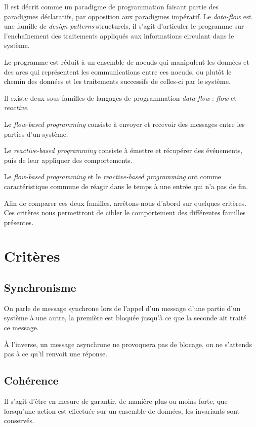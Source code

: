 \documentclass{article}
\begin{document}
Il est décrit comme un paradigme de programmation faisant partie des paradigmes
déclaratifs, par opposition aux paradigmes impératif.
Le \emph{data-flow} est une famille de \emph{design patterns} structurels,
il s'agit d'articuler le programme sur l'enchaînement des
traitements appliqués aux informations circulant dans le système.

Le programme est réduit à un ensemble de noeuds qui
manipulent les données et des arcs qui représentent les
communications entre ces noeuds, ou plutôt le chemin des
données et les traitements successifs de celles-ci par le système.

Il existe deux sous-familles de langages de programmation \emph{data-flow} :
\emph{flow} et \emph{reactive}.

Le \emph{flow-based programming} consiste à envoyer et recevoir des messages entre
les parties d'un système.

Le \emph{reactive-based programming} consiste à émettre et récupérer des événements,
puis de leur appliquer des comportements.

Le \emph{flow-based programming} et le \emph{reactive-based programming} ont comme
caractéristique commune de réagir dans le temps à une entrée qui n'a pas de fin.

Afin de comparer ces deux familles, arrêtons-nous d'abord sur quelques critères.
Ces critères nous permettront de cibler le comportement des différentes familles présentes.

\section{Critères}\label{criteres}
\subsection{Synchronisme}
On parle de message synchrone lors de l'appel d'un message d'une partie d'un système
à une autre, la première est bloquée jusqu'à ce que la seconde ait traité ce message.

À l'inverse, un message asynchrone ne provoquera pas de blocage, on ne s'attends pas
à ce qu'il renvoit une réponse.

\subsection{Cohérence}
Il s'agit d'être en mesure de garantir, de manière plus ou moins forte, que lorsqu'une
action est effectuée sur un ensemble de données, les invariants sont conservés.
\end{document}

